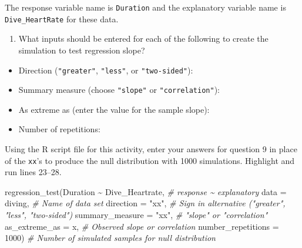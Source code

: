 \documentclass[
]{report}
\newenvironment{Shaded}{\begin{snugshade}}{\end{snugshade}}
\newcommand{\AttributeTok}[1]{\textcolor[rgb]{0.77,0.63,0.00}{#1}}
\newcommand{\CommentTok}[1]{\textcolor[rgb]{0.56,0.35,0.01}{\textit{#1}}}
\newcommand{\DecValTok}[1]{\textcolor[rgb]{0.00,0.00,0.81}{#1}}
\newcommand{\FunctionTok}[1]{\textcolor[rgb]{0.00,0.00,0.00}{#1}}
\newcommand{\NormalTok}[1]{#1}
\newcommand{\SpecialCharTok}[1]{\textcolor[rgb]{0.00,0.00,0.00}{#1}}
\newcommand{\StringTok}[1]{\textcolor[rgb]{0.31,0.60,0.02}{#1}}
\providecommand{\tightlist}{%
  \setlength{\itemsep}{0pt}\setlength{\parskip}{0pt}}
\begin{document}
The response variable name is \texttt{Duration} and the explanatory variable name is \texttt{Dive\_HeartRate} for these data.

\begin{enumerate}
\def\labelenumi{\arabic{enumi}.}
\setcounter{enumi}{8}
\tightlist
\item
  What inputs should be entered for each of the following to create the simulation to test regression slope?
\end{enumerate}

\vspace{.5 mm}

\begin{itemize}
\tightlist
\item
  Direction (\texttt{"greater"}, \texttt{"less"}, or \texttt{"two-sided"}):
\end{itemize}

\vspace{.2in}

\begin{itemize}
\tightlist
\item
  Summary measure (choose \texttt{"slope"} or \texttt{"correlation"}):
\end{itemize}

\vspace{.2in}

\begin{itemize}
\tightlist
\item
  As extreme as (enter the value for the sample slope):
\end{itemize}

\vspace{0.2in}

\begin{itemize}
\tightlist
\item
  Number of repetitions:
\end{itemize}

\vspace{.2in}

Using the R script file for this activity, enter your answers for question 9 in place of the \texttt{xx}'s to produce the null distribution with 1000 simulations. Highlight and run lines 23--28.

\begin{Shaded}
\begin{Highlighting}[]
\FunctionTok{regression\_test}\NormalTok{(Duration }\SpecialCharTok{\textasciitilde{}}\NormalTok{ Dive\_Heartrate, }\CommentTok{\# response \textasciitilde{} explanatory}
               \AttributeTok{data =}\NormalTok{ diving, }\CommentTok{\# Name of data set}
               \AttributeTok{direction =} \StringTok{"xx"}\NormalTok{, }\CommentTok{\# Sign in alternative ("greater", "less", "two{-}sided")}
               \AttributeTok{summary\_measure =} \StringTok{"xx"}\NormalTok{, }\CommentTok{\# "slope" or "correlation"}
               \AttributeTok{as\_extreme\_as =}\NormalTok{ x, }\CommentTok{\# Observed slope or correlation}
               \AttributeTok{number\_repetitions =} \DecValTok{1000}\NormalTok{) }\CommentTok{\# Number of simulated samples for null distribution}
\end{Highlighting}
\end{Shaded}
\end{document}
